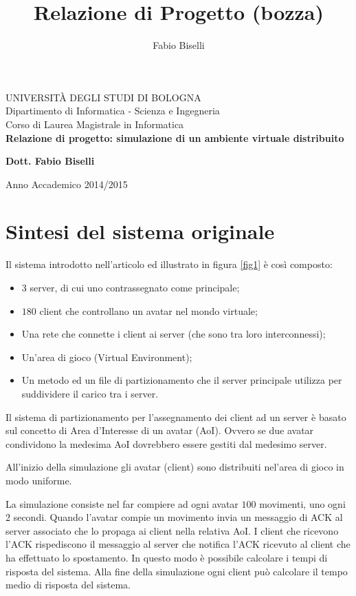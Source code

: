 \documentclass[a4paper, 11pt, oneside]{book}
\author{Fabio Biselli}
\title{Relazione di Progetto (bozza)}
\date{}
\theoremstyle{definition}
\theoremstyle{remark}
\begin{document}
\begin{titlepage}

\begin{center}
\Large UNIVERSIT\`A DEGLI STUDI DI BOLOGNA\\
Dipartimento di Informatica - Scienza e Ingegneria\\
\bigskip
\Large Corso di Laurea Magistrale in Informatica\\
\vspace{100pt}
\huge \textbf{Relazione di progetto: simulazione di un
ambiente virtuale distribuito}
\end{center}
\vspace{120pt}
\large
\begin{center}
\textbf{Dott. Fabio Biselli}
\end{center}
\normalsize
\bigskip
\begin{center}
Anno Accademico 2014/2015
\end{center}
\end{titlepage}

\tableofcontents

\section{Sintesi del sistema originale}
Il sistema introdotto nell'articolo ed illustrato in figura \ref{fig1}
è così composto:
\begin{itemize}
\item
$3$ server, di cui uno contrassegnato come principale;
\item
$180$ client che controllano un avatar nel mondo virtuale;
\item
Una rete che connette i client ai server (che sono tra loro interconnessi);
\item
Un'area di gioco (Virtual Environment);
\item
Un metodo ed un file di partizionamento che il server principale utilizza per
suddividere il carico tra i server.
\end{itemize}

Il sistema di partizionamento per l'assegnamento dei client ad un server è
basato sul concetto di Area d'Interesse di un avatar (AoI). Ovvero se due
avatar condividono la medesima AoI dovrebbero essere gestiti dal medesimo
server.

All'inizio della simulazione gli avatar (client) sono distribuiti nel'area
di gioco in modo uniforme.  

La simulazione consiste nel far compiere ad ogni avatar $100$ movimenti, uno
ogni $2$ secondi. Quando l'avatar compie un movimento invia un messaggio di
ACK al server associato che lo propaga ai client nella relativa AoI.
I client che ricevono l'ACK rispediscono il messaggio al server che notifica
l'ACK ricevuto al client che ha effettuato lo spostamento. In questo modo è
possibile calcolare i tempi di risposta del sistema.
Alla fine della simulazione ogni client può calcolare il tempo medio di
risposta del sistema.
\end{document}
